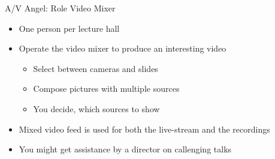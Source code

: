 
\begin{frame}{A/V Angel: Role Video Mixer}
	\begin{itemize}
		\item One person per lecture hall
		\item Operate the video mixer to produce an interesting video
		\begin{itemize}
			\item Select between cameras and slides
			\item Compose pictures with multiple sources
			\item You decide, which sources to show
		\end{itemize}
		\item Mixed video feed is used for both the live-stream and the recordings 
		\item You might get assistance by a director on callenging talks
	\end{itemize}
\end{frame}
